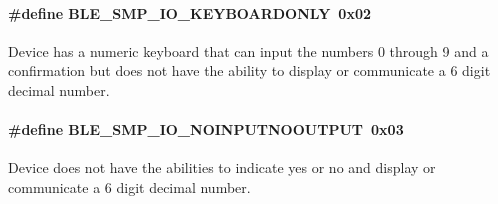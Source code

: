 \paragraph[{\texorpdfstring{B\+L\+E\+\_\+\+S\+M\+P\+\_\+\+I\+O\+\_\+\+K\+E\+Y\+B\+O\+A\+R\+D\+O\+N\+LY}{BLE_SMP_IO_KEYBOARDONLY}}]{\setlength{\rightskip}{0pt plus 5cm}\#define B\+L\+E\+\_\+\+S\+M\+P\+\_\+\+I\+O\+\_\+\+K\+E\+Y\+B\+O\+A\+R\+D\+O\+N\+LY~0x02}\hypertarget{group___b_l_e___s_m_p___i_o___c_a_p_a_b_i_l_i_t_y___d_e_f_gaa0b8abfa8022f1fe77d3229fe60fd484}{}\label{group___b_l_e___s_m_p___i_o___c_a_p_a_b_i_l_i_t_y___d_e_f_gaa0b8abfa8022f1fe77d3229fe60fd484}
Device has a numeric keyboard that can input the numbers 0 through 9 and a confirmation but does not have the ability to display or communicate a 6 digit decimal number. 
\paragraph[{\texorpdfstring{B\+L\+E\+\_\+\+S\+M\+P\+\_\+\+I\+O\+\_\+\+N\+O\+I\+N\+P\+U\+T\+N\+O\+O\+U\+T\+P\+UT}{BLE_SMP_IO_NOINPUTNOOUTPUT}}]{\setlength{\rightskip}{0pt plus 5cm}\#define B\+L\+E\+\_\+\+S\+M\+P\+\_\+\+I\+O\+\_\+\+N\+O\+I\+N\+P\+U\+T\+N\+O\+O\+U\+T\+P\+UT~0x03}\hypertarget{group___b_l_e___s_m_p___i_o___c_a_p_a_b_i_l_i_t_y___d_e_f_ga804bf60a8dc42605986a87f5d980d064}{}\label{group___b_l_e___s_m_p___i_o___c_a_p_a_b_i_l_i_t_y___d_e_f_ga804bf60a8dc42605986a87f5d980d064}
Device does not have the abilities to indicate yes or no and display or communicate a 6 digit decimal number. 